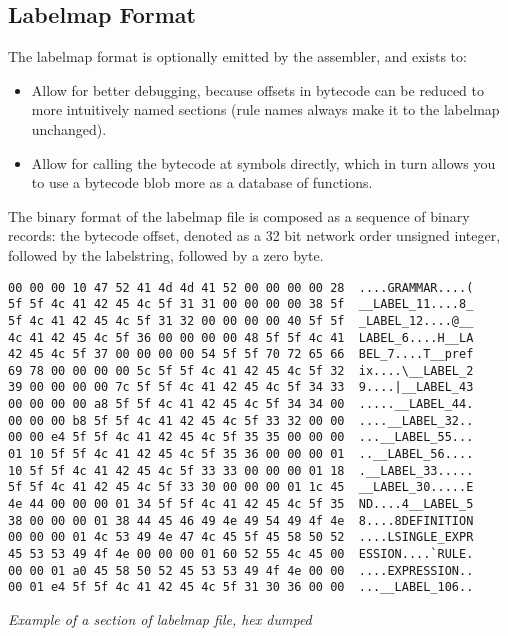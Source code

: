 \subsection{Labelmap Format}

The labelmap format is optionally emitted by the assembler, and exists to:

\begin{itemize}
\item Allow for better debugging, because offsets in bytecode can be reduced
      to more intuitively named sections (rule names always make it to
      the labelmap unchanged).
\item Allow for calling the bytecode at symbols directly, which in turn
      allows you to use a bytecode blob more as a database of functions.
\end{itemize}

The binary format of the labelmap file is composed as a sequence of
binary records: the bytecode offset, denoted as a 32 bit network order
unsigned integer, followed by the labelstring, followed by a zero byte.

\begin{myquote}
\begin{verbatim}
00 00 00 10 47 52 41 4d 4d 41 52 00 00 00 00 28  ....GRAMMAR....(
5f 5f 4c 41 42 45 4c 5f 31 31 00 00 00 00 38 5f  __LABEL_11....8_
5f 4c 41 42 45 4c 5f 31 32 00 00 00 00 40 5f 5f  _LABEL_12....@__
4c 41 42 45 4c 5f 36 00 00 00 00 48 5f 5f 4c 41  LABEL_6....H__LA
42 45 4c 5f 37 00 00 00 00 54 5f 5f 70 72 65 66  BEL_7....T__pref
69 78 00 00 00 00 5c 5f 5f 4c 41 42 45 4c 5f 32  ix....\__LABEL_2
39 00 00 00 00 7c 5f 5f 4c 41 42 45 4c 5f 34 33  9....|__LABEL_43
00 00 00 00 a8 5f 5f 4c 41 42 45 4c 5f 34 34 00  .....__LABEL_44.
00 00 00 b8 5f 5f 4c 41 42 45 4c 5f 33 32 00 00  ....__LABEL_32..
00 00 e4 5f 5f 4c 41 42 45 4c 5f 35 35 00 00 00  ...__LABEL_55...
01 10 5f 5f 4c 41 42 45 4c 5f 35 36 00 00 00 01  ..__LABEL_56....
10 5f 5f 4c 41 42 45 4c 5f 33 33 00 00 00 01 18  .__LABEL_33.....
5f 5f 4c 41 42 45 4c 5f 33 30 00 00 00 01 1c 45  __LABEL_30.....E
4e 44 00 00 00 01 34 5f 5f 4c 41 42 45 4c 5f 35  ND....4__LABEL_5
38 00 00 00 01 38 44 45 46 49 4e 49 54 49 4f 4e  8....8DEFINITION
00 00 00 01 4c 53 49 4e 47 4c 45 5f 45 58 50 52  ....LSINGLE_EXPR
45 53 53 49 4f 4e 00 00 00 01 60 52 55 4c 45 00  ESSION....`RULE.
00 00 01 a0 45 58 50 52 45 53 53 49 4f 4e 00 00  ....EXPRESSION..
00 01 e4 5f 5f 4c 41 42 45 4c 5f 31 30 36 00 00  ...__LABEL_106..
\end{verbatim}
\end{myquote}
\textit{Example of a section of labelmap file, hex dumped}

